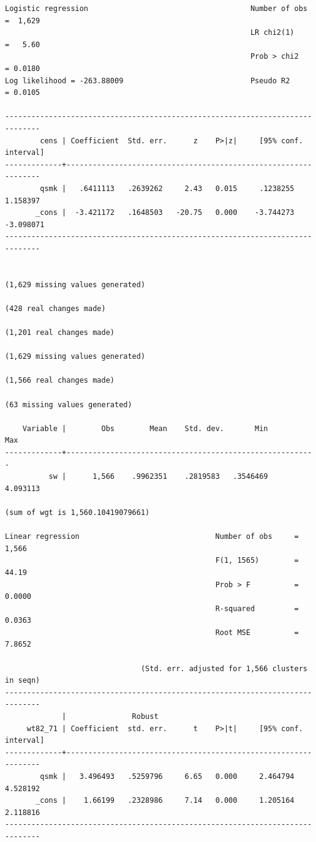 \documentclass[
  10pt,
  a4paper,
]{book}
\begin{document}
\begin{verbatim}
Logistic regression                                     Number of obs =  1,629
                                                        LR chi2(1)    =   5.60
                                                        Prob > chi2   = 0.0180
Log likelihood = -263.88009                             Pseudo R2     = 0.0105

------------------------------------------------------------------------------
        cens | Coefficient  Std. err.      z    P>|z|     [95% conf. interval]
-------------+----------------------------------------------------------------
        qsmk |   .6411113   .2639262     2.43   0.015     .1238255    1.158397
       _cons |  -3.421172   .1648503   -20.75   0.000    -3.744273   -3.098071
------------------------------------------------------------------------------


(1,629 missing values generated)

(428 real changes made)

(1,201 real changes made)

(1,629 missing values generated)

(1,566 real changes made)

(63 missing values generated)

    Variable |        Obs        Mean    Std. dev.       Min        Max
-------------+---------------------------------------------------------
          sw |      1,566    .9962351    .2819583   .3546469   4.093113

(sum of wgt is 1,560.10419079661)

Linear regression                               Number of obs     =      1,566
                                                F(1, 1565)        =      44.19
                                                Prob > F          =     0.0000
                                                R-squared         =     0.0363
                                                Root MSE          =     7.8652

                               (Std. err. adjusted for 1,566 clusters in seqn)
------------------------------------------------------------------------------
             |               Robust
     wt82_71 | Coefficient  std. err.      t    P>|t|     [95% conf. interval]
-------------+----------------------------------------------------------------
        qsmk |   3.496493   .5259796     6.65   0.000     2.464794    4.528192
       _cons |    1.66199   .2328986     7.14   0.000     1.205164    2.118816
------------------------------------------------------------------------------
\end{verbatim}
\end{document}
